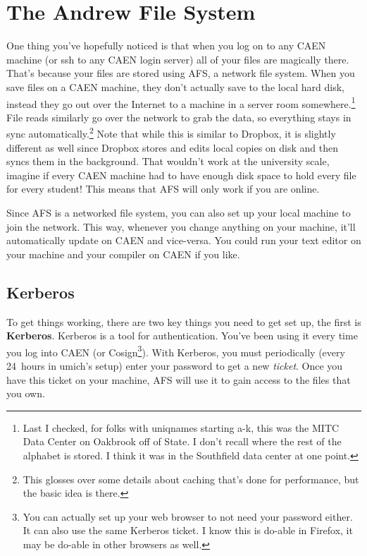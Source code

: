 \documentclass{article}
\begin{document}
\section*{The Andrew File System}

One thing you've hopefully noticed is that when you log on to any CAEN machine
(or ssh to any CAEN login server) all of your files are magically there.
That's because your files are stored using AFS, a network file system. When
you save files on a CAEN machine, they don't actually save to the local hard
disk, instead they go out over the Internet to a machine in a server room
somewhere.\footnote{Last I checked, for folks with uniqnames starting a-k,
this was the MITC Data Center on Oakbrook off of State. I don't recall where
the rest of the alphabet is stored. I think it was in the Southfield data
center at one point.} File reads similarly go over the network to grab the
data, so everything stays in sync automatically.\footnote{This glosses over
  some details about caching that's done for performance, but the basic idea
  is there.} Note that while this is similar to Dropbox, it is slightly
different as well since Dropbox stores and edits local copies on disk and then
syncs them in the background. That wouldn't work at the university scale,
imagine if every CAEN machine had to have enough disk space to hold every file
for every student! This means that AFS will only work if you are online.

Since AFS is a networked file system, you can also set up your local machine
to join the network.  This way, whenever you change anything on your machine,
it'll automatically update on CAEN and vice-versa. You could run your text
editor on your machine and your compiler on CAEN if you like.

\subsection*{Kerberos}

To get things working, there are two key things you need to get set up, the
first is \textbf{Kerberos}. Kerberos is a tool for authentication. You've been
using it every time you log into CAEN (or Cosign\footnote{
  You can actually set up your web browser to not need your password either.
  It can also use the same Kerberos ticket. I know this is do-able in Firefox,
  it may be do-able in other browsers as well.
}). With Kerberos, you must periodically (every 24~hours in umich's setup)
enter your password to get a new \emph{ticket}. Once you have this ticket on
your machine, AFS will use it to gain access to the files that you own.
\end{document}
